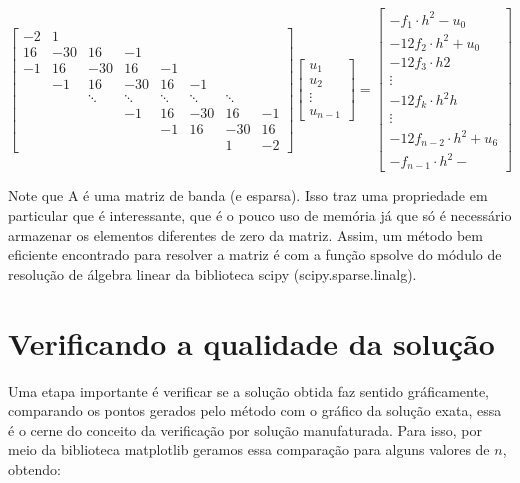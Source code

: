 \documentclass[pdftex, 12pt, a4paper]{report}
\begin{document}
\[
\begin{bmatrix}
    -2 & 1 & &  & \\
    16 & -30 & 16 & -1& && \\
    -1 & 16 & -30  & 16 & -1 \\
     & -1 & 16 &-30&16&-1\\
    &      &  \ddots & \ddots &\ddots&\ddots&\ddots\\
    &       &         & -1&16&-30&16&-1\\
    &       &         &   & -1& 16&-30&16\\
    &       &         &   &   &   & 1& -2
\end{bmatrix}  
\begin{bmatrix}
    u_1 \\
    u_2 \\
    \vdots \\
    u_{n-1}
\end{bmatrix}
    = 
\begin{bmatrix}

    -f_1\cdot h^{2} - u_0 \\
    -12f_2\cdot h^{2} + u_0\\
    -12f_3\cdot h{2} \\
    \vdots\\
    -12f_k\cdot h^{2}h\\
    \vdots\\
    -12f_{n-2}\cdot h^{2} + u_6\\
    -f_{n-1}\cdot h^{2}-

\end{bmatrix}
\]

Note que A é uma matriz de banda (e esparsa). Isso traz uma propriedade em particular que é interessante, que é o pouco uso de memória já que só é necessário armazenar os elementos diferentes de zero da matriz. Assim, um método bem eficiente encontrado para resolver a matriz é com a função spsolve do módulo de resolução de álgebra linear da biblioteca scipy (scipy.sparse.linalg).

\section{Verificando a qualidade da solução}
Uma etapa importante é verificar se a solução obtida faz sentido gráficamente, comparando os pontos gerados pelo método com o gráfico da solução exata, essa é o cerne do conceito da verificação por solução manufaturada. Para isso, por meio da biblioteca matplotlib geramos essa comparação para alguns valores de $n$, obtendo:
\end{document}
